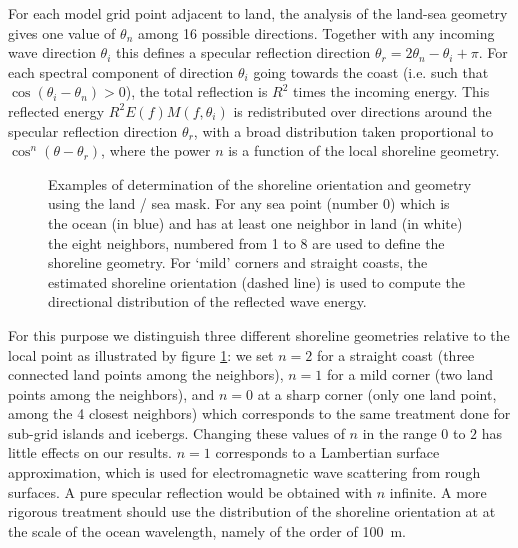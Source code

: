 For each model grid point adjacent to land, the analysis of the land-sea
geometry gives one value of $\theta_n$ among 16 possible directions. Together
with any incoming wave direction $\theta_i$ this defines a specular reflection
direction $\theta_r=2 \theta_n - \theta_i + \pi$.  For each spectral component
of direction $\theta_i$ going towards the coast (i.e. such that
$\cos(\theta_i-\theta_n) >0$), the total reflection is $R^2$ times the
incoming energy. This reflected energy $R^2 E(f) M(f,\theta_i)$ is
redistributed over directions around the specular reflection direction
$\theta_r$, with a broad distribution taken proportional to
$\cos^n(\theta-\theta_r)$, where the power $n$ is a function of the local
shoreline geometry.

\begin{figure} \begin{center}
\caption{Examples of determination of the shoreline orientation and geometry
  using the land / sea mask. For any sea point (number 0) which is the ocean
  (in blue) and has at least one neighbor in land (in white) the eight
  neighbors, numbered from 1 to 8 are used to define the shoreline geometry.
  For `mild' corners and straight coasts, the estimated shoreline orientation
  (dashed line) is used to compute the directional distribution of the
  reflected wave energy.  }
\label{fig:refl} \botline
\end{center}
\end{figure}

For this purpose we distinguish three different shoreline geometries relative
to the local point as illustrated by figure \ref{fig:refl}: we set $n=2$ for a
straight coast (three connected land points among the neighbors), $n=1$ for a
mild corner (two land points among the neighbors), and $n=0$ at a sharp corner
(only one land point, among the 4 closest neighbors) which corresponds to the
same treatment done for sub-grid islands and icebergs. Changing these values
of $n$ in the range $0$ to $2$ has little effects on our results.  $n=1$
corresponds to a Lambertian surface approximation, which is used for
electromagnetic wave scattering from rough surfaces. A pure specular
reflection would be obtained with $n$ infinite.  A more rigorous treatment
should use the distribution of the shoreline orientation at at the scale of
the ocean wavelength, namely of the order of 100~m.
